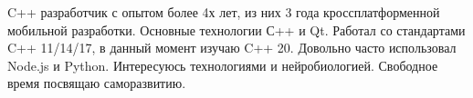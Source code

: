 

\begin{cvparagraph}

C++ разработчик с опытом более 4х лет, из них 3 года кроссплатформенной мобильной разработки. Основные технологии С++ и Qt.
Работал со стандартами C++ 11/14/17, в данный момент изучаю C++ 20. Довольно часто использовал Node.js и Python.
Интересуюсь технологиями и нейробиологией. Свободное время посвящаю саморазвитию.
\end{cvparagraph}
